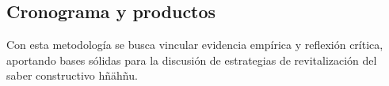 \subsection{Cronograma y productos}

Con esta metodología se busca vincular evidencia empírica y reflexión
crítica, aportando bases sólidas para la discusión de estrategias de
revitalización del saber constructivo hñähñu.
